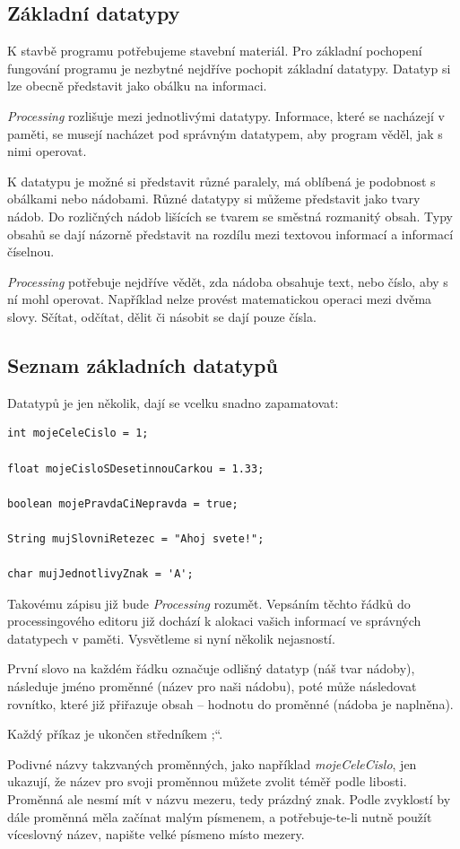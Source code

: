 \documentclass[10pt,twoside=true,open=right,cleardoublepage=empty,chapterprefix=true]{scrbook}
\renewcommand\uv[1]{\quotedblbase #1\textquotedblleft}%
\newcommand{\pododdil}[1]{\subsection{#1}\index{#1}\label{#1}}
\newcommand{\lnb}{\linebreak}
\begin{document}
\pododdil{Základní datatypy}

K stavbě programu potřebujeme stavební materiál. Pro základní pochopení fungování programu je nezbytné nejdříve pochopit základní datatypy. Datatyp si lze obecně představit jako obálku na informaci.

{\em Processing} rozlišuje mezi jednotlivými datatypy. Informace, které se nacházejí v paměti, se musejí nacházet pod správným datatypem, aby program věděl, jak s nimi operovat.

K datatypu je možné si představit různé paralely, má oblíbená je podobnost s obálkami nebo nádobami. Různé datatypy si můžeme představit jako tvary nádob. Do rozličných nádob lišících se tvarem se směstná rozmanitý obsah. Typy obsahů se dají názorně představit na rozdílu mezi textovou informací a informací číselnou.

{\em Processing} potřebuje nejdříve vědět, zda nádoba obsahuje text, nebo číslo, aby s ní mohl operovat. Například nelze provést matematickou operaci mezi dvěma slovy. Sčítat, odčítat, dělit či násobit se dají pouze čísla.


\pododdil{Seznam základních datatypů}
Datatypů je jen několik, dají se vcelku snadno zapamatovat:

\begin{lstlisting}
int mojeCeleCislo = 1;

float mojeCisloSDesetinnouCarkou = 1.33;

boolean mojePravdaCiNepravda = true;

String mujSlovniRetezec = "Ahoj svete!";

char mujJednotlivyZnak = 'A';

\end{lstlisting}

Takovému zápisu již bude {\em Processing} rozumět. Vepsáním těchto řádků do processingového editoru již dochází k alokaci vašich informací ve správných datatypech v paměti. Vysvětleme si nyní několik nejasností.

První slovo na každém řádku označuje odlišný datatyp (náš tvar nádoby), následuje jméno proměnné (název pro naši nádobu), poté může následovat rovnítko, které již přiřazuje obsah -- hodnotu do proměnné (nádoba je naplněna).

Každý příkaz je ukončen středníkem \uv{;}.

Podivné názvy takzvaných proměnných, jako například {\em mojeCeleCislo}, jen ukazují, že název pro svoji proměnnou můžete zvolit téměř podle libosti. Proměnná ale nesmí mít v názvu mezeru, tedy prázdný znak. Podle zvyklostí by dále proměnná měla začínat malým písmenem, a potřebuje-\lnb te-li nutně použít víceslovný název, napište velké písmeno místo mezery.
\end{document}
